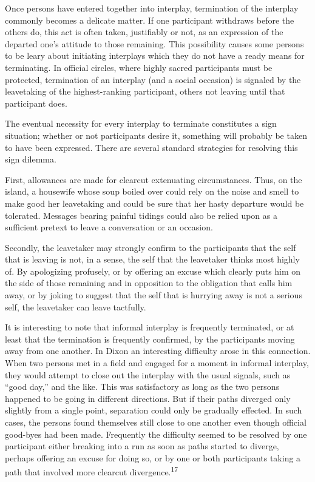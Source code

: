 \documentclass[openany,nobib]{tufte-book}
\begin{document}
Once persons have entered together into interplay, termination of the
interplay commonly becomes a delicate matter. If one participant
withdraws before the others do, this act is often taken, justifiably or
not, as an expression of the departed one's attitude to those remaining.
This possibility causes some persons to be leary about initiating
interplays which they do not have a ready means for terminating. In
official circles, where highly sacred participants must be protected,
termination of an interplay (and a social occasion) is signaled by the
leavetaking of the highest-ranking participant, others not leaving until
that participant does.

The eventual necessity for every interplay to terminate constitutes a
sign situation; whether or not participants desire it, something will
probably be taken to have been expressed. There are several standard
strategies for resolving this sign dilemma.

First, allowances are made for clearcut extenuating circumstances. Thus,
on the island, a housewife whose soup boiled over could rely on the
noise and smell to make good her leavetaking and could be sure that her
hasty departure would be tolerated. Messages bearing painful tidings
could also be relied upon as a sufficient pretext to leave a
conversation or an occasion.

Secondly, the leavetaker may strongly confirm to the participants that
the self that is leaving is not, in a sense, the self that the
leavetaker thinks most highly of. By apologizing profusely, or by
offering an excuse which clearly puts him on the side of those remaining
and in opposition to the obligation that calls him away, or by joking to
suggest that the self that is hurrying away is not a serious self, the
leavetaker can leave tactfully.

It is interesting to note that informal interplay is frequently
terminated, or at least that the termination is frequently confirmed, by
the participants moving away from one another. In Dixon an interesting
difficulty arose in this connection. When two persons met in a field and
engaged for a moment in informal interplay, they would attempt to close
out the interplay with the usual signals, such as ``good day,'' and the
like. This was satisfactory as long as the two persons happened to be
going in different directions. But if their paths diverged only slightly
from a single point, separation could only be gradually effected. In
such cases, the persons found themselves still close to one another even
though official good-byes had been made. Frequently the difficulty
seemed to be resolved by one participant either breaking into a run as
soon as paths started to diverge, perhaps offering an excuse for doing
so, or by one or both participants taking a path that involved more
clearcut divergence.\textsuperscript{17}
\end{document}
